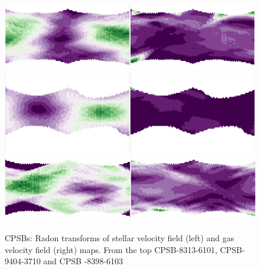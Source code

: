 
\begin{figure}
    \centering
    \includegraphics[width=\columnwidth]{images/RadonPlots/RT-snips/CPSB-8313-6101-RT-snip.png}
    \includegraphics[width=\columnwidth]{images/RadonPlots/RT-snips/CPSB-9494-3701-RT-snip.png}
    \includegraphics[width=\columnwidth]{images/RadonPlots/RT-snips/CPSB-8398-6102-RT-snip.png}
    \caption{CPSBs: Radon transforms of stellar velocity field (left) and gas velocity field (right) maps. From the top CPSB-8313-6101, CPSB-9404-3710 and CPSB -8398-6103}
    \label{fig:CPSB-RTs}
\end{figure}

